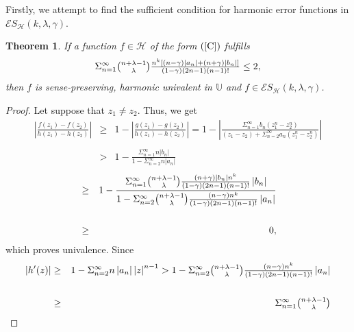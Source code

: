 \documentclass[12pt,reqno]{amsart}
\newtheorem{theorem}{Theorem}
\begin{document}
Firstly, we attempt to find the sufficient condition for harmonic error
functions in $\mathcal{E}S_{\mathcal{H}}(k,\lambda ,\gamma ).$

\begin{theorem}
\label{t1}If a function $f\in \mathcal{H}$ of the form $(\ref{C})$ fulfills
\begin{equation}
\Sigma_{n=1}^{\infty}\tbinom{n+\lambda -1}{\lambda }\tfrac{n^{k}\left[
(n-\gamma )\left\vert a_{n}\right\vert +(n+\gamma )\left\vert
b_{n}\right\vert \right] }{(1-\gamma )(2n-1)(n-1)!}\leq 2,  \label{2`1}
\end{equation}%
then $f$ is sense-preserving, harmonic univalent in $\mathbb{U}$ and $f\in 
\mathcal{E}S_{\mathcal{H}}(k,\lambda ,\gamma )$.
\end{theorem}

\begin{proof}
Let suppose that $z_{1}\neq z_{2}.$ Thus, we get%
\begin{eqnarray*}
\left\vert \frac{f(z_{1})-f(z_{2})}{h(z_{1})-h(z_{2})}\right\vert &\geq
&1-\left\vert \frac{g(z_{1})-g(z_{2})}{h(z_{1})-h(z_{2})}\right\vert
=1-\left\vert \frac{\Sigma_{n=1}^{\infty}b_{n}\left(
z_{1}^{n}-z_{2}^{n}\right) }{\left( z_{1}-z_{2}\right) +\Sigma_{n=2}^{\infty}a_{n}\left( z_{1}^{n}-z_{2}^{n}\right) }\right\vert
\\
&& \\
&>&1-\frac{\Sigma_{n=1}^{\infty}n\left\vert
b_{n}\right\vert }{1-\Sigma_{n=2}^{\infty}n\left\vert
a_{n}\right\vert }
\end{eqnarray*}
\begin{eqnarray*}
&\geq &1-\frac{\Sigma_{n=1}^{\infty}\binom{n+\lambda -1}{%
\lambda }\frac{(n+\gamma )\left\vert b_{n}\right\vert n^{k}}{(1-\gamma
)(2n-1)(n-1)!}\left\vert b_{n}\right\vert }{1-\Sigma_{n=2}^{\infty}\binom{n+\lambda -1}{\lambda }\frac{(n-\gamma )n^{k}}{(1-\gamma
)(2n-1)(n-1)!}\left\vert a_{n}\right\vert } \\
&& \\
&\geq &0,
\end{eqnarray*}
which proves univalence. Since 
\begin{eqnarray*}
\left\vert h^{\prime }(z)\right\vert &\geq &1-\Sigma_{n=2}^{\infty}n\left\vert a_{n}\right\vert \left\vert z\right\vert ^{n-1}>1-\Sigma_{n=2}^{\infty}\tbinom{n+\lambda -1}{\lambda }\tfrac{(n-\gamma )n^{k}}{(1-\gamma )(2n-1)(n-1)!}\left\vert a_{n}\right\vert \\
&& \\
&\geq &\Sigma_{n=1}^{\infty}\tbinom{n+\lambda -1}{\lambda }%

\end{eqnarray*}
\end{proof}
\end{document}
